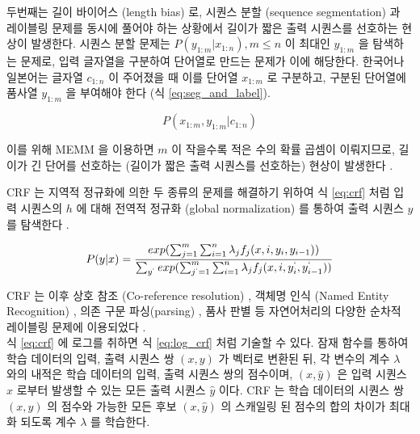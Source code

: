 \documentclass[oneside, ko,phd]{snuthesis_utf8_kor}
\begin{document}
두번째는 길이 바이어스 (length bias) 로, 시퀀스 분할 (sequence segmentation) 과 레이블링 문제를 동시에 풀어야 하는 상황에서 길이가 짧은 출력 시퀀스를 선호하는 현상이 발생한다.
시퀀스 분할 문제는 $P(y_{1:m} \vert x_{1:n}), m \le n$ 이 최대인 $y_{1:m}$ 을 탐색하는 문제로, 입력 글자열을 구분하여 단어열로 만드는 문제가 이에 해당한다.
한국어나 일본어는 글자열 $c_{1:n}$ 이 주어졌을 때 이를 단어열 $x_{1:m}$ 로 구분하고, 구분된 단어열에 품사열 $y_{1:m}$ 을 부여해야 한다 (식 \ref{eq:seg_and_label}).

\begin{equation}
  \label{eq:seg_and_label}
  P(x_{1:m}, y_{1:m} \vert c_{1:n})
\end{equation}

이를 위해 MEMM 을 이용하면 $m$ 이 작을수록 적은 수의 확률 곱셈이 이뤄지므로, 길이가 긴 단어를 선호하는 (길이가 짧은 출력 시퀀스를 선호하는) 현상이 발생한다 \cite{kudo2004applying}.

CRF 는 지역적 정규화에 의한 두 종류의 문제를 해결하기 위하여 식 \ref{eq:crf} 처럼 입력 시퀀스의 $h$ 에 대해 전역적 정규화 (global normalization) 를 통하여 출력 시퀀스 $y$ 를 탐색한다 \cite{lafferty2001conditional}.

\begin{equation}
  \label{eq:crf}
  P(y \vert x) = \frac{exp(\sum_{j=1}^{m} \sum_{i=1}^{n} \lambda_j f_j (x, i, y_i, y_{i-1}))}{ \sum_{y^{`}} exp(\sum_{j^{`}=1}^{m} \sum_{i=1}^{n} \lambda_j f_j (x, i, y_i^{`}, y_{i-1}^{`})) }
\end{equation}

CRF 는 이후 상호 참조 (Co-reference resolution) \cite{mccallum2005conditional}, 객체명 인식 (Named Entity Recognition)  \cite{ritter2011named, minkov2005extracting, ling2012fine, sang2003introduction, sarawagi2005semi}, 의존 구문 파싱(parsing) \cite{sha2003shallow, finkel2008efficient}, 품사 판별 \cite{toutanova2003feature, gimpel2010part} 등 자연어처리의 다양한 순차적 레이블링 문제에 이용되었다 \cite{choi2005identifying, mccallum2003early}. \\

식 \ref{eq:crf} 에 로그를 취하면 식 \ref{eq:log_crf} 처럼 기술할 수 있다.
잠재 함수를 통하여 학습 데이터의 입력, 출력 시퀀스 쌍 $(x, y)$ 가 벡터로 변환된 뒤, 각 변수의 계수 $\lambda$ 와의 내적은 학습 데이터의 입력, 출력 시퀀스 쌍의 점수이며, $(x, \hat{y})$ 은 입력 시퀀스 $x$ 로부터 발생할 수 있는 모든 출력 시퀀스 $\hat{y}$ 이다.
CRF 는 학습 데이터의 시퀀스 쌍 $(x, y)$ 의 점수와 가능한 모든 후보 $(x, \hat{y})$ 의 스캐일링 된 점수의 합의 차이가 최대화 되도록 계수 $\lambda$ 를 학습한다.
\end{document}
